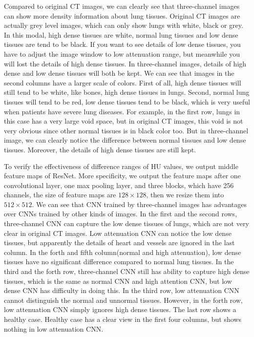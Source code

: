\documentclass[runningheads]{llncs}
\begin{document}
Compared to original CT images, we can clearly see that three-channel images can show more density information about lung tissues. Original CT images are actually grey level images, which can only show lungs with white, black or grey. In this modal, high dense tissues are white, normal lung tissues and low dense tissues are tend to be black. If you want to see details of low dense tissues, you have to adjust the image window to low attenuation range, but meanwhile you will lost the details of high dense tissues. In three-channel images, details of high dense and low dense tissues will both be kept. We can see that images in the second columns have a larger scale of colors. First of all, high dense tissues will still tend to be white, like bones, high dense tissues in lungs. Second, normal lung tissues will tend to be red, low dense tissues tend to be black, which is very useful when patients have severe lung diseases. For example, in the first row, lungs in this case has a very large void space, but in original CT images, this void is not very obvious since other normal tissues is in black color too. But in three-channel image, we can clearly notice the difference between normal tissues and low dense tissues. Moreover, the details of high dense tissues are still kept.

To verify the effectiveness of difference ranges of HU values, we output middle feature maps of ResNet. More specificity, we output the feature maps after one convolutional layer, one max pooling layer, and three blocks, which have 256 channels, the size of feature maps are $128 \times 128$, then we resize them into $512 \times 512$. We can see that CNN trained by three-channel images has advantages over CNNs trained by other kinds of images. In the first and the second rows, three-channel CNN can capture the low dense tissues of lungs, which are not very clear in original CT images. Low attenuation CNN can notice the low dense tissues, but apparently the details of heart and vessels are ignored in the last column. In the forth and fifth column(normal and high attenuation), low dense tissues have no significant difference compared to normal lung tissues.
In the third and the forth row, three-channel CNN still has ability to capture high dense tissues, which is the same as normal CNN and high attention CNN, but low dense CNN has difficulty in doing this. In the third row, low attenuation CNN cannot distinguish the normal and unnormal tissues. However, in the forth row, low attenuation CNN simply ignores high dense tissues. The last row shows a healthy case. Healthy case has a clear view in the first four columns, but shows nothing in low attenuation CNN.
\end{document}
